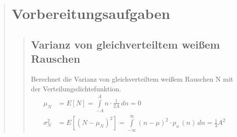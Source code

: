 \begin{quote}
\section{Vorbereitungsaufgaben}
\begin{quote}
    \hspace{-2em}
    \subsection{Varianz von gleichverteiltem weißem Rauschen}
    Berechnet die Varianz von gleichverteiltem weißem Rauschen N mit der Verteilungsdichtefunktion.\\
    
     \begin{equation*}
    	\begin{split}
    	    \mu_{N}&=E[N]=\int\limits_{-A}^{A} n \cdot \frac{1}{2A} \,dn=0 \\
    		\sigma_{N}^2&=E[(N-\mu_{N})^2]=\int\limits_{-\infty}^{\infty} (n-\mu)^2
    		\cdot p_{u}\,(n) \,dn=\frac{1}{3}A^2
    	\end{split}
     \end{equation*}
    
   
    
    \end{quote}
      
\end{quote}



